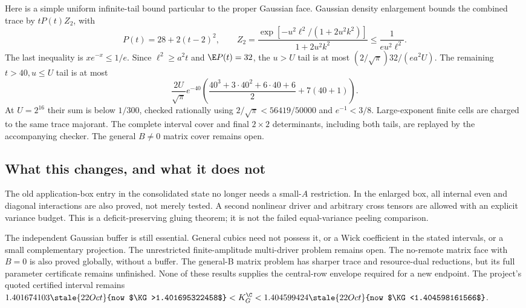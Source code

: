 Here is a simple uniform infinite-tail bound particular to the proper Gaussian face. Gaussian density enlargement bounds the combined trace by $tP(t)Z_2$, with
\[
 P(t)=28+2(t-2)^2,\qquad
 Z_2=\frac{\exp[-u^2\ell^2/(1+2u^2k^2)]}{1+2u^2k^2}
 \le\frac1{eu^2\ell^2}.
\]
The last inequality is $xe^{-x}\le1/e$. Since $\ell^2\ge a^2t$ and $\E P(t)=32$, the $u>U$ tail is at most $(2/\sqrt\pi)32/(ea^2U)$. The remaining $t>40,u\le U$ tail is at most
\[
 \frac{2U}{\sqrt\pi}e^{-40}
 \left(\frac{40^3+3\cdot40^2+6\cdot40+6}{2}+7(40+1)\right).
\]
At $U=2^{16}$ their sum is below $1/300$, checked rationally using $2/\sqrt\pi<56419/50000$ and $e^{-1}<3/8$. Large-exponent finite cells are charged to the same trace majorant. The complete interval cover and final $2\times2$ determinants, including both tails, are replayed by the accompanying checker. The general $B\ne0$ matrix cover remains open.

\subsection{What this changes, and what it does not}
The old application-box entry in the consolidated state no longer needs a small-$A$ restriction. In the enlarged box, all internal even and diagonal interactions are also proved, not merely tested. A second nonlinear driver and arbitrary cross tensors are allowed with an explicit variance budget. This is a deficit-preserving gluing theorem; it is not the failed equal-variance peeling comparison.

The independent Gaussian buffer is still essential. General cubics need not possess it, or a Wick coefficient in the stated intervals, or a small complementary projection. The unrestricted finite-amplitude multi-driver problem remains open. The no-remote matrix face with $B=0$ is also proved globally, without a buffer. The general-B matrix problem has sharper trace and resource-dual reductions, but its full parameter certificate remains unfinished. None of these results supplies the central-row envelope required for a new endpoint. The project's quoted certified interval remains $1.401674103\stale{22 Oct}{now $\KG>1.401695322458$}<K_G^{\C}<1.404599424\stale{22 Oct}{now $\KG<1.404598161566$}$.
